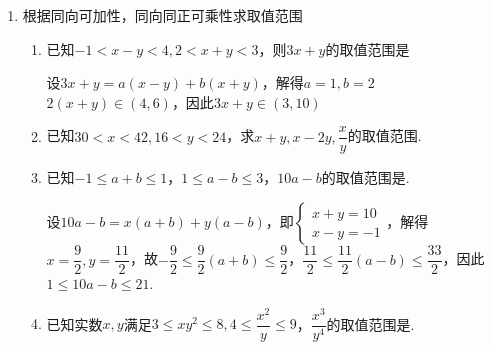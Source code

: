 \begin{enumerate}
\begin{enumerate}
        \begin{jieda}
            $\dfrac{1}{a+1} - (1-a) = \dfrac{a^2}{a+1}$，故$a < -1$时，$\dfrac{1}{a+1} < 1-a$；$a = 0$时，$\dfrac{1}{a+1} = 1-a$；$a \in (-1, 0) \cup (0, +\infty)$时，$\dfrac{1}{a+1} > 1-a$；
        \end{jieda}
    \end{enumerate}
    \item 根据同向可加性，同向同正可乘性求取值范围
    \begin{enumerate}
        \item 已知$-1 < x-y < 4, 2 < x+y < 3$，则$3x+y$的取值范围是
        \begin{jieda}
            设$3x+y = a(x-y) + b(x+y)$，解得$a = 1, b = 2$ \\
            $2(x+y) \in (4, 6)$，因此$3x+y \in (3, 10)$
        \end{jieda}
        \item 已知$30 < x < 42, 16 < y < 24$，求$x+y, x-2y, \dfrac{x}{y}$的取值范围.
        \begin{jieda}
        \end{jieda}
        \item 已知$-1 \leq a+b \leq 1$，$1 \leq a-b \leq 3$，$10a - b$的取值范围是\blkda{$[1,21]$}.
        \begin{jieda}
            设$10a - b = x(a+b) + y(a-b)$，即$\left \{ \begin{array}{l}
                x+y = 10  \\
                x-y = -1 
            \end{array} \right.$，解得$x = \dfrac{9}{2}, y = \dfrac{11}{2}$，故$-\dfrac{9}{2} \leq \dfrac{9}{2}(a+b) \leq \dfrac{9}{2}$，$\dfrac{11}{2} \leq \dfrac{11}{2}(a-b) \leq \dfrac{33}{2}$，因此$1 \leq 10a-b \leq 21$.
        \end{jieda}
        \item 已知实数$x, y$满足$3 \leq xy^2 \leq 8, 4 \leq \dfrac{x^2}{y} \leq 9$，$\dfrac{x^3}{y^4}$的取值范围是\blkda{$[2, 27]$}.

\end{enumerate}
\end{enumerate}
